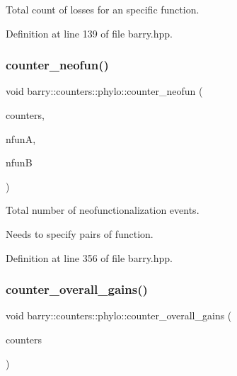 Total count of losses for an specific function. 



Definition at line 139 of file barry.\+hpp.

\mbox{\label{namespacebarry_1_1counters_1_1phylo_a9a68f426b83f9b7fad0457930b60064c}} 
\subsubsection{\texorpdfstring{counter\+\_\+neofun()}{counter\_neofun()}}
{\footnotesize\ttfamily void barry\+::counters\+::phylo\+::counter\+\_\+neofun (\begin{DoxyParamCaption}\item[{\hyperlink{namespacebarry_1_1counters_1_1phylo_a2f117d1cd1dff67e1539cbc0aef5766a}{Phylo\+Counter\+Vector} $\ast$}]{counters,  }\item[{\hyperlink{namespacebarry_a11dfc53ddb4672278319aa04f1e09a6c}{uint}}]{nfunA,  }\item[{\hyperlink{namespacebarry_a11dfc53ddb4672278319aa04f1e09a6c}{uint}}]{nfunB }\end{DoxyParamCaption})\hspace{0.3cm}{\ttfamily [inline]}}



Total number of neofunctionalization events. 

Needs to specify pairs of function. 

Definition at line 356 of file barry.\+hpp.

\mbox{\label{namespacebarry_1_1counters_1_1phylo_a6f3a551165270e27f874d3df4d07cf8b}} 
\subsubsection{\texorpdfstring{counter\+\_\+overall\+\_\+gains()}{counter\_overall\_gains()}}
{\footnotesize\ttfamily void barry\+::counters\+::phylo\+::counter\+\_\+overall\+\_\+gains (\begin{DoxyParamCaption}\item[{\hyperlink{namespacebarry_1_1counters_1_1phylo_a2f117d1cd1dff67e1539cbc0aef5766a}{Phylo\+Counter\+Vector} $\ast$}]{counters }\end{DoxyParamCaption})\hspace{0.3cm}{\ttfamily [inline]}}



